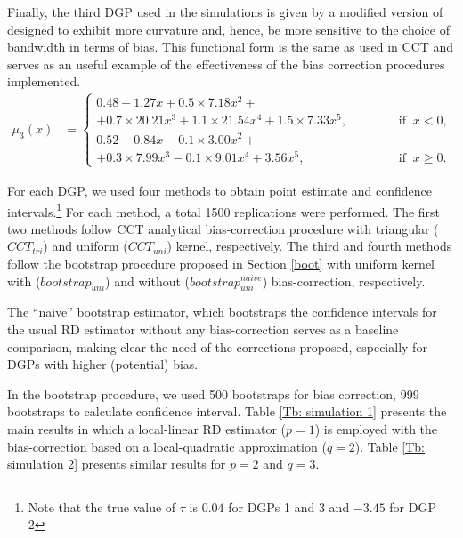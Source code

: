 \documentclass[12pt,fleqn]{article}
\begin{document}
Finally, the third DGP used in the simulations is given by a modified version of  \cite{lee2008rand} designed to exhibit more curvature and, hence, be more sensitive to the choice of bandwidth in terms of bias. This functional form is the same as used in CCT and serves as an useful example of the effectiveness of the bias correction procedures implemented.
\begin{align}
\mu_{3}(x) & =
\begin{cases}
0.48 + 1.27x + 0.5 \times 7.18x^{2}+ \\
+ 0.7 \times 20.21x^3 + 1.1 \times 21.54x^4 + 1.5 \times 7.33x^5, \;\;\;\;\;\;\;\;\;\;\;\; & \text{if} \;\; x < 0, \\
0.52 + 0.84x - 0.1 \times 3.00x^{2}+ \\
+ 0.3 \times 7.99x^3 - 0.1 \times 9.01x^4 + 3.56x^5, & \text{if} \;\; x \ge 0.
\end{cases}
\end{align}

For each DGP, we used four methods to obtain point estimate and confidence intervals.\footnote{Note that the true value of $\tau$ is $0.04$ for DGPs 1 and 3 and $-3.45$ for DGP 2} For each method, a total 1500 replications were performed. The first two methods follow CCT analytical bias-correction procedure with triangular ($CCT_{tri}$) and uniform ($CCT_{uni}$) kernel, respectively. The third and fourth methods follow the bootstrap procedure proposed in Section \ref{boot} with uniform kernel with ($bootstrap_{uni}$) and without ($bootstrap_{uni}^{naive}$) bias-correction, respectively.

The ``naive'' bootstrap estimator, which bootstraps the confidence intervals for the usual RD estimator without any bias-correction serves as a baseline comparison, making clear the need of the corrections proposed, especially for DGPs with higher (potential) bias.

In the bootstrap procedure, we used 500 bootstraps for bias correction, 999 bootstraps to calculate confidence interval. Table \ref{Tb: simulation 1} presents the main results in which a local-linear RD estimator ($p=1$) is employed with the bias-correction based on a local-quadratic approximation ($q=2$). Table \ref{Tb: simulation 2} presents similar results for $p=2$ and $q=3$.
\end{document}

